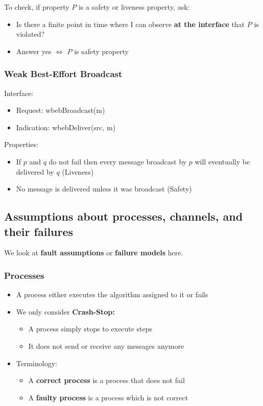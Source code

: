 \documentclass{scrartcl}
\begin{document}
\bigbreak

To check, if property \(P\) is a safety or liveness property, ask:
\begin{itemize}
    \item
        Is there a finite point in time where I can observe \textbf{at the interface} that \(P\) is violated?
    \item
        Answer yes \(\Leftrightarrow\) \(P\) is safety property
\end{itemize}

\subsubsection{Weak Best-Effort Broadcast}
Interface:
\begin{itemize}
    \item
        Request: wbebBroadcast(m)
    \item
        Indication: wbebDeliver(src, m)
\end{itemize}

Properties:
\begin{itemize}
    \item
        If \(p\) and \(q\) do not fail then every message broadcast by \(p\) will eventually be delivered by \(q\) (Liveness)
    \item
        No message is delivered unless it was broadcast (Safety)
\end{itemize}

\subsection{Assumptions about processes, channels, and their failures}
We look at \textbf{fault assumptions} or \textbf{failure models} here.
\subsubsection{Processes}
\begin{itemize}
    \item
        A process either executes the algorithm assigned to it or fails 
    \item
        We only consider \textbf{Crash-Stop:}
        \begin{itemize}
            \item
                A process simply stops to execute steps
            \item
                It does not send or receive any messages anymore
        \end{itemize}
    \item
        Terminology:
        \begin{itemize}
            \item
                A \textbf{correct process} is a process that does not fail
            \item
                A \textbf{faulty process} is a process which is not correct
                
        \end{itemize}
\end{itemize}
\end{document}
